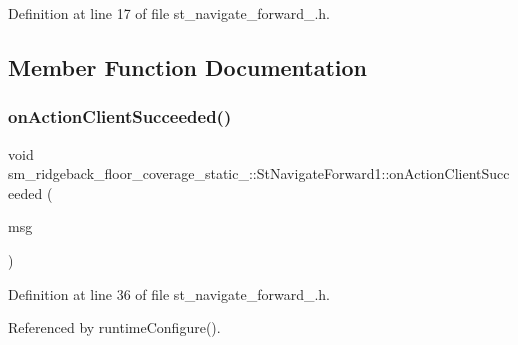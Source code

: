 Definition at line 17 of file st\+\_\+navigate\+\_\+forward\+\_.\+h.



\subsection{Member Function Documentation}
\mbox{\label{structsm__ridgeback__floor__coverage__static__1_1_1StNavigateForward1_ac459cf53276a9d78e6c40627c47a5e67}} 
\subsubsection{\texorpdfstring{on\+Action\+Client\+Succeeded()}{onActionClientSucceeded()}}
{\footnotesize\ttfamily void sm\+\_\+ridgeback\+\_\+floor\+\_\+coverage\+\_\+static\+\_\+::\+St\+Navigate\+Forward1\+::on\+Action\+Client\+Succeeded (\begin{DoxyParamCaption}\item[{\hyperlink{classcl__move__base__z_1_1ClMoveBaseZ_a99373d0c15ae96684462d8677f5fd632}{Cl\+Move\+Base\+Z\+::\+Result\+Const\+Ptr} \&}]{msg }\end{DoxyParamCaption})\hspace{0.3cm}{\ttfamily [inline]}}



Definition at line 36 of file st\+\_\+navigate\+\_\+forward\+\_.\+h.



Referenced by runtime\+Configure().


